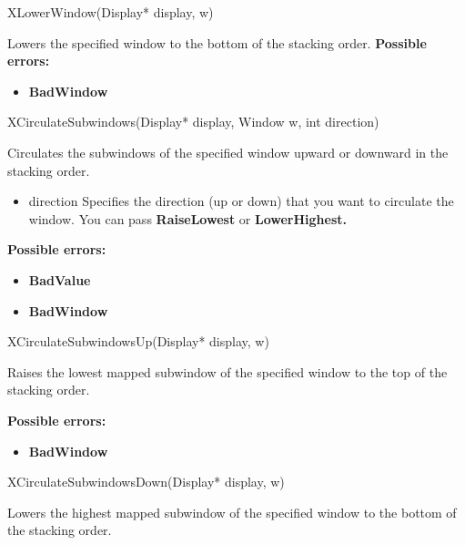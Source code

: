 \documentclass{report}
\begin{document}
\begin{itemize}
            \begin{cppcode}
                XLowerWindow(Display* display, w)
            \end{cppcode}
            \bigbreak \noindent
            Lowers the specified window to the bottom of the stacking order.
            \bigbreak \noindent
            \textbf{Possible errors:}
            \begin{itemize}
                \item \textbf{BadWindow}
            \end{itemize}

            \begin{cppcode}
                XCirculateSubwindows(Display* display, Window w, int direction)
            \end{cppcode}
            \bigbreak \noindent
            Circulates the subwindows of the specified window upward or downward in the stacking order.

            \begin{itemize}
                \item direction Specifies the direction (up or down) that you want to circulate the window. You can pass \textbf{RaiseLowest} or \textbf{LowerHighest.}
            \end{itemize}

            \bigbreak \noindent
            \textbf{Possible errors:}
            \begin{itemize}
                \item \textbf{BadValue}
                \item \textbf{BadWindow}
            \end{itemize}

            \begin{cppcode}
                XCirculateSubwindowsUp(Display* display, w)
            \end{cppcode}
            \bigbreak \noindent
            Raises the lowest mapped subwindow of the specified window to the top of the stacking order.

            \bigbreak \noindent
            \textbf{Possible errors:}
            \begin{itemize}
                \item \textbf{BadWindow}
            \end{itemize}

            \begin{cppcode}
                XCirculateSubwindowsDown(Display* display, w)
            \end{cppcode}
            \bigbreak \noindent
            Lowers the highest mapped subwindow of the specified window to the bottom of the stacking order.


\end{itemize}
\end{document}
